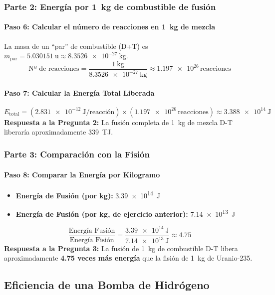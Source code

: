 \documentclass[11pt,a4paper]{article}
\begin{document}
\begin{enumerate}
\subsubsection*{Parte 2: Energía por \SI{1}{\kilo\gram} de combustible de fusión}

\paragraph{Paso 6: Calcular el número de reacciones en \SI{1}{\kilo\gram} de mezcla}
La masa de un ``par'' de combustible (D+T) es $m_{\text{par}} = \SI{5.030151}{\atomicmassunit} \approx \SI{8.3526e-27}{\kilo\gram}$.
\[ \text{Nº de reacciones} = \frac{\SI{1}{\kilo\gram}}{\SI{8.3526e-27}{\kilo\gram}} \approx \num{1.197e26} \, \text{reacciones} \]

\paragraph{Paso 7: Calcular la Energía Total Liberada}
\[ E_{\text{total}} = (\SI{2.831e-12}{\joule\per\text{reacción}}) \times (\num{1.197e26} \, \text{reacciones}) \approx \SI{3.388e14}{\joule} \]
\textbf{Respuesta a la Pregunta 2:} La fusión completa de \SI{1}{\kilo\gram} de mezcla D-T liberaría aproximadamente \SI{339}{\tera\joule}.

\subsubsection*{Parte 3: Comparación con la Fisión}

\paragraph{Paso 8: Comparar la Energía por Kilogramo}
\begin{itemize}
    \item \textbf{Energía de Fusión (por kg):} \SI{3.39e14}{\joule}
    \item \textbf{Energía de Fusión (por kg, de ejercicio anterior):} \SI{7.14e13}{\joule}
\end{itemize}
\[ \frac{\text{Energía Fusión}}{\text{Energía Fisión}} = \frac{\SI{3.39e14}{\joule}}{\SI{7.14e13}{\joule}} \approx 4.75 \]
\textbf{Respuesta a la Pregunta 3:} La fusión de \SI{1}{\kilo\gram} de combustible D-T libera aproximadamente \textbf{4.75 veces más energía} que la fisión de \SI{1}{\kilo\gram} de Uranio-235.

\subsection*{Eficiencia de una Bomba de Hidrógeno}


\end{enumerate}
\end{document}
